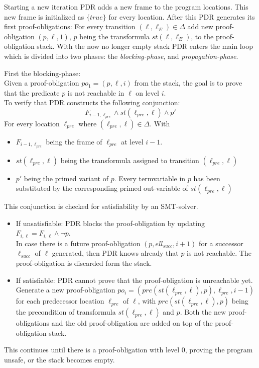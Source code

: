 \documentclass{article}
\begin{document}
	Starting a new iteration PDR adds a new frame to the program locations. This new frame is initialized as $\{true\}$ for every location. After this PDR generates its first proof-obligations: For every transition $(\ell, \ell_E) \in \Delta$ add new proof-obligation $(p, \ell, 1)$, $p$ being the transformula $st(\ell, \ell_E)$, to the proof-obligation stack. With the now no longer empty stack PDR enters the main loop which is divided into two phases: the \textsl{blocking-phase}, and \textsl{propagation-phase}.
	
	\bigskip
	
	First the blocking-phase: \\ 
	Given a proof-obligation $po_1 = (p, \ell, i)$ from the stack, the goal is to prove that the predicate $p$ is not reachable in $\ell$ on level $i$. \\ To verify that PDR constructs the following conjunction:
	\begin{equation*}
		F_{i - 1, \ell_{pre}} \land st(\ell_{pre}, \ell) \land p'
	\end{equation*}
	For every location $\ell_{pre}$ where $(\ell_{pre}, \ell) \in \Delta$. With 
	\begin{itemize}
		\item $F_{i - 1, \ell_{pre}}$ being the frame of $\ell_{pre}$ at level $i - 1$.
		\item $st(\ell_{pre}, \ell)$ being the transformula assigned to transition $(\ell_{pre}, \ell)$
		\item $p'$ being the primed variant of $p$. Every termvariable in $p$ has been substituted by the corresponding primed out-variable of $st(\ell_{pre}, \ell)$
	\end{itemize}
	This conjunction is checked for satisfiability by an SMT-solver.
	\begin{itemize}
		\item If unsatisfiable: PDR blocks the proof-obligation by updating $F_{i, \ell} = F_{i, \ell} \land \neg p$. \\ In case there is a future proof-obligation $(p, ell_{succ}, i + 1)$ for a successor $\ell_{succ}$ of $\ell$ generated, then PDR knows already that $p$ is not reachable. The proof-obligation is discarded form the stack.
		\item If satisfiable: PDR cannot prove that the proof-obligation is unreachable yet. Generate a new proof-obligation $po_i = (pre(st(\ell_{pre}, \ell), p), \ell_{pre}, i-1) $ for each predecessor location $\ell_{pre}$ of $\ell$, with $pre(st(\ell_{pre}, \ell), p)$ being the precondition of transformula $st(\ell_{pre}, \ell)$ and $p$. Both the new proof-obligations and the old proof-obligation are added on top of the proof-obligation stack.
	\end{itemize}
	This continues until there is a proof-obligation with level 0, proving the program unsafe, or the stack becomes empty.
	\bigskip
	
\end{document}
